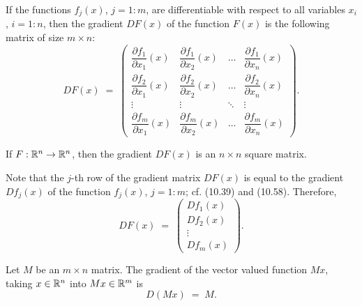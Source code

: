 If the functions $f_j(x)$, $j = 1:m$, are differentiable with respect to all
variables $x_i$, $i = 1:n$, then the gradient $DF(x)$ of the function $F(x)$ is the
following matrix of size $m \times n$:
\begin{equation}
DF(x) \;=\; \begin{pmatrix}
\dfrac{\partial f_1}{\partial x_1}(x) & \dfrac{\partial f_1}{\partial x_2}(x) & \ldots & \dfrac{\partial f_1}{\partial x_n}(x) \\[1.2ex]
\dfrac{\partial f_2}{\partial x_1}(x) & \dfrac{\partial f_2}{\partial x_2}(x) & \ldots & \dfrac{\partial f_2}{\partial x_n}(x) \\[1.2ex]
\vdots & \vdots & \ddots & \vdots \\[0.6ex]
\dfrac{\partial f_m}{\partial x_1}(x) & \dfrac{\partial f_m}{\partial x_2}(x) & \ldots & \dfrac{\partial f_m}{\partial x_n}(x)
\end{pmatrix}.
\end{equation}

If $F : \mathbb{R}^n \to \mathbb{R}^n$, then the gradient $DF(x)$ is an $n \times n$ square matrix.

Note that the $j$-th row of the gradient matrix $DF(x)$ is equal to the gradient
$Df_j(x)$ of the function $f_j(x)$, $j = 1:m$; cf. (10.39) and (10.58). Therefore,
\begin{equation}
DF(x) \;=\; \begin{pmatrix} Df_1(x) \\ Df_2(x) \\ \vdots \\ Df_m(x) \end{pmatrix}.
\end{equation}

\begin{lemma}
Let $M$ be an $m \times n$ matrix. The gradient of the vector valued function $Mx$,
taking $x \in \mathbb{R}^n$ into $Mx \in \mathbb{R}^m$ is
\begin{equation}
D(Mx) \;=\; M.
\end{equation}
\end{lemma}

